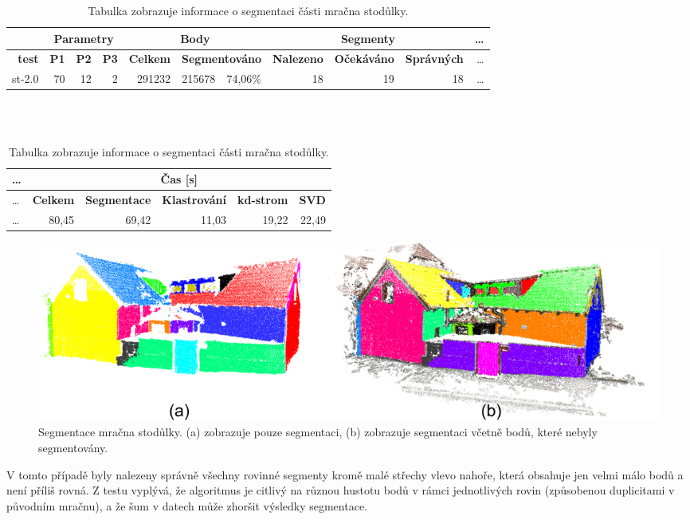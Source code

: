 \documentclass[11pt,twoside,a4paper]{book}
\begin{document}
\begin{changeheight}{3cm}
\begin{table}[ht]
\resizebox{\textwidth}{!} {
\begin{tabular}{|r|r|r|r|r|r|r|r|r|r|r|}
\hline
&\multicolumn{3}{c|}{\textbf{Parametry}} & \multicolumn{3}{c|}{\textbf{Body}} & \multicolumn{3}{c|}{\textbf{Segmenty}}&\ldots\\ \hline
\textbf{test} & \textbf{P1} & \textbf{P2} & \textbf{P3} & \textbf{Celkem} & \multicolumn{2}{c|}{\textbf{Segmentováno}} & \textbf{Nalezeno} & \textbf{Očekáváno} & \textbf{Správných} &\ldots\\ \hline
st-2.0 & 70 & 12 & 2 & 291232 & 215678 & 74,06\% & 18 & 19 & 18 &\ldots\\ \hline
\end{tabular}
}\\ \\
\begin{flushright} \scalebox{0.9} {
\begin{tabular}{|l|r|r|r|r|r|}
\hline
\ldots&\multicolumn{5}{|c|}{\textbf{Čas [s]}} \\ \hline
\ldots&\textbf{Celkem} & \textbf{Segmentace} & \textbf{Klastrování} & \textbf{kd-strom} & \textbf{SVD} \\\hline
\ldots&80,45 & 69,42 & 11,03 & 19,22 & 22,49 \\ \hline
\end{tabular}
}\end{flushright}

\caption{Tabulka zobrazuje informace o segmentaci části mračna stodůlky.} 
\label{table:test-st-2}
\end{table}

\begin{figure}[H]
\begin{center}
\includegraphics[width=\textwidth]{figures/test-st-2}
\caption{Segmentace mračna stodůlky. (a) zobrazuje pouze segmentaci, (b) zobrazuje segmentaci včetně bodů, které nebyly segmentovány.}
\label{fig:test-st-2}
\end{center}
\end{figure}
V tomto případě byly nalezeny správně všechny rovinné segmenty kromě malé střechy vlevo nahoře, která obsahuje jen velmi málo bodů a není příliš rovná. Z testu vyplývá, že algoritmus je citlivý na různou hustotu bodů v rámci jednotlivých rovin (způsobenou duplicitami v původním mračnu), a že šum v datech může zhoršit výsledky segmentace.
\end{changeheight}
\end{document}

